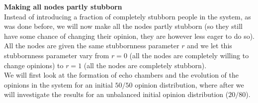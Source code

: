 \documentclass[11 pt , letterpaper , twoside , openright]{book}
\begin{document}
\textbf{Making all nodes partly stubborn}\\
\newline
Instead of introducing a fraction of completely stubborn people in the system, as was done before, we will now make all the nodes partly stubborn (so they still have some chance of changing their opinion, they are however less eager to do so). All the nodes are given the same stubbornness parameter $r$ and we let this stubbornness parameter vary from $r = 0$ (all the nodes are completely willing to change opinions) to $r=1$ (all the nodes are completely stubborn).\\
We will first look at the formation of echo chambers and the evolution of the opinions in the system for an initial $50/50$ opinion distribution, where after we will investigate the results for an unbalanced initial opinion distribution ($20/80$).
\end{document}
